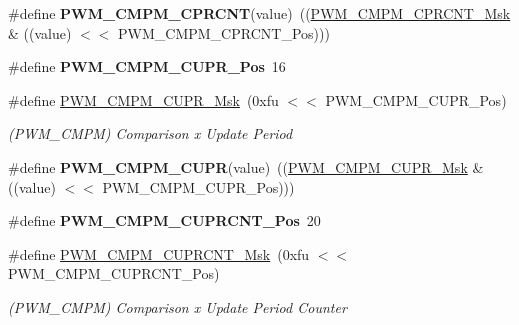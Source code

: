 \begin{DoxyCompactItemize}
\#define {\bfseries P\+W\+M\+\_\+\+C\+M\+P\+M\+\_\+\+C\+P\+R\+C\+NT}(value)~((\mbox{\hyperlink{group__SAMV71__PWM_ga2945c884ad4aab06150ae99c19542202}{P\+W\+M\+\_\+\+C\+M\+P\+M\+\_\+\+C\+P\+R\+C\+N\+T\+\_\+\+Msk}} \& ((value) $<$$<$ P\+W\+M\+\_\+\+C\+M\+P\+M\+\_\+\+C\+P\+R\+C\+N\+T\+\_\+\+Pos)))
\item 
\mbox{\label{group__SAMS70__PWM_ga487940e89e6d4b4a554a13b88e876c83}} 
\#define {\bfseries P\+W\+M\+\_\+\+C\+M\+P\+M\+\_\+\+C\+U\+P\+R\+\_\+\+Pos}~16
\item 
\mbox{\label{group__SAMS70__PWM_gaadd54a225ed379648b3693dfbcc56a15}} 
\#define \mbox{\hyperlink{group__SAMS70__PWM_gaadd54a225ed379648b3693dfbcc56a15}{P\+W\+M\+\_\+\+C\+M\+P\+M\+\_\+\+C\+U\+P\+R\+\_\+\+Msk}}~(0xfu $<$$<$ P\+W\+M\+\_\+\+C\+M\+P\+M\+\_\+\+C\+U\+P\+R\+\_\+\+Pos)
\begin{DoxyCompactList}\small\item\em (P\+W\+M\+\_\+\+C\+M\+PM) Comparison x Update Period \end{DoxyCompactList}\item 
\mbox{\label{group__SAMS70__PWM_ga133c06bab5d24a9d97b1c7f44c698ae4}} 
\#define {\bfseries P\+W\+M\+\_\+\+C\+M\+P\+M\+\_\+\+C\+U\+PR}(value)~((\mbox{\hyperlink{group__SAMV71__PWM_gaadd54a225ed379648b3693dfbcc56a15}{P\+W\+M\+\_\+\+C\+M\+P\+M\+\_\+\+C\+U\+P\+R\+\_\+\+Msk}} \& ((value) $<$$<$ P\+W\+M\+\_\+\+C\+M\+P\+M\+\_\+\+C\+U\+P\+R\+\_\+\+Pos)))
\item 
\mbox{\label{group__SAMS70__PWM_ga046611de8ee0cc576937fed666f286ea}} 
\#define {\bfseries P\+W\+M\+\_\+\+C\+M\+P\+M\+\_\+\+C\+U\+P\+R\+C\+N\+T\+\_\+\+Pos}~20
\item 
\mbox{\label{group__SAMS70__PWM_ga2fbf78eae63da097297b020afcf6febe}} 
\#define \mbox{\hyperlink{group__SAMS70__PWM_ga2fbf78eae63da097297b020afcf6febe}{P\+W\+M\+\_\+\+C\+M\+P\+M\+\_\+\+C\+U\+P\+R\+C\+N\+T\+\_\+\+Msk}}~(0xfu $<$$<$ P\+W\+M\+\_\+\+C\+M\+P\+M\+\_\+\+C\+U\+P\+R\+C\+N\+T\+\_\+\+Pos)
\begin{DoxyCompactList}\small\item\em (P\+W\+M\+\_\+\+C\+M\+PM) Comparison x Update Period Counter \end{DoxyCompactList}\item 

\end{DoxyCompactItemize}
